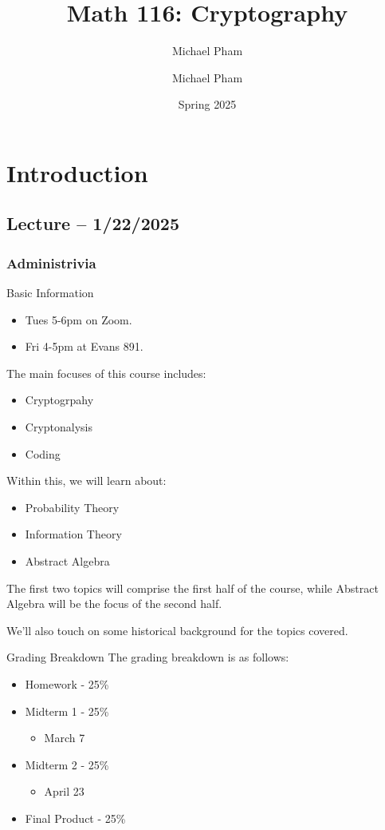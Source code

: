 \documentclass[openany]{book}
\title{#1}
\author{Michael Pham}
\date{#2}
\renewcommand{\mytitle}[2]{%
	\title{#1}
	\author{Michael Pham}
	\date{#2}
	\maketitle
	\newpage
	\mytoc
	\newpage
}
\begin{document}
\mytitle{Math 116: Cryptography}{Spring 2025}

\chapter{Introduction}
\section{Lecture -- 1/22/2025}
\subsection{Administrivia}
\begin{miscbox}{Basic Information}
	\begin{itemize}
		\item Tues 5-6pm on Zoom.
		\item Fri 4-5pm at Evans 891.
	\end{itemize}
\end{miscbox}

The main focuses of this course includes:
\begin{itemize}
	\item Cryptogrpahy
	\item Cryptonalysis
	\item Coding
\end{itemize}

Within this, we will learn about:
\begin{itemize}
	\item Probability Theory
	\item Information Theory
	\item Abstract Algebra
\end{itemize}

The first two topics will comprise the first half of the course, while Abstract Algebra will be the focus of the second half.

We'll also touch on some historical background for the topics covered.

\begin{miscbox}{Grading Breakdown}
	The grading breakdown is as follows:
	\begin{itemize}
		\item Homework - 25\%
		\item Midterm 1 - 25\%
		\begin{itemize}
			\item March 7
		\end{itemize}
		\item Midterm 2 - 25\%
		\begin{itemize}
			\item April 23
		\end{itemize}
		\item Final Product - 25\%
	\end{itemize}
\end{miscbox}
\end{document}
